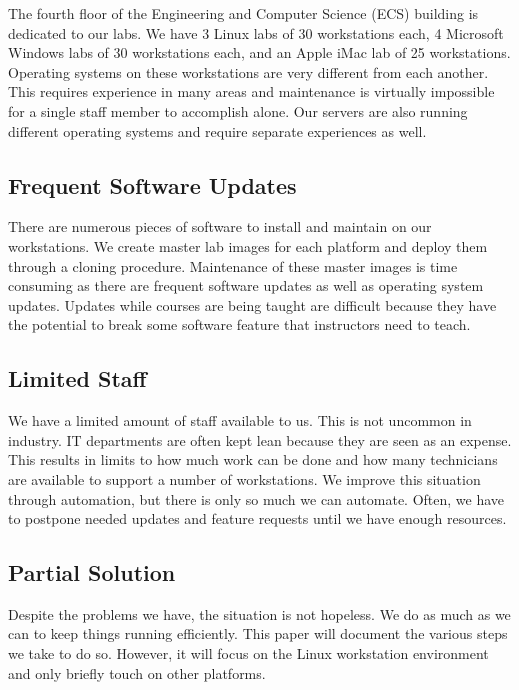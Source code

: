 The fourth floor of the Engineering and Computer Science (ECS) building is dedicated to our labs.  We have 3 Linux labs of 30 workstations each, 4 Microsoft Windows labs of 30 workstations each, and an Apple iMac lab of 25 workstations.  Operating systems on these workstations are very different from each another.  This requires experience in many areas and maintenance is virtually impossible for a single staff member to accomplish alone.  Our servers are also running different operating systems and require separate experiences as well. 

\subsection{Frequent Software Updates}

There are numerous pieces of software to install and maintain on our workstations.  We create master lab images for each platform and deploy them through a cloning procedure.  Maintenance of these master images is time consuming as there are frequent software updates as well as operating system updates.  Updates while courses are being taught are difficult because they have the potential to break some software feature that instructors need to teach. 

\subsection{Limited Staff}

We have a limited amount of staff available to us.  This is not uncommon in industry.  IT departments are often kept lean because they are seen as an expense.  This results in limits to how much work can be done and how many technicians are available to support a number of workstations.  We improve this situation through automation, but there is only so much we can automate.  Often, we have to postpone needed updates and feature requests until we have enough resources.

\subsection{Partial Solution}
Despite the problems we have, the situation is not hopeless.  We do as much as we can to keep things running efficiently.  This paper will document the various steps we take to do so.  However, it will focus on the Linux workstation environment and only briefly touch on other platforms.  

